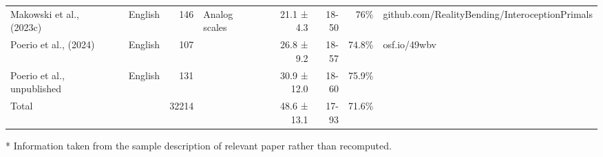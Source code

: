 \begin{table}[!t]
\begin{tabular*}{\linewidth}{@{\extracolsep{\fill}}lllrlrrrl}
Makowski et al., (2023c) &  & English & 146 & Analog scales & 21.1 ± 4.3 & 18-50 & 76\% & github.com/RealityBending/InteroceptionPrimals \\ 
Poerio et al., (2024) &  & English & 107 &  & 26.8 ± 9.2 & 18-57 & 74.8\% & osf.io/49wbv \\ 
Poerio et al., unpublished &  & English & 131 &  & 30.9 ± 12.0 & 18-60 & 75.9\% &  \\ 
Total &  &  & 32214 &  & 48.6 ± 13.1 & 17-93 & 71.6\% &  \\ 
\bottomrule
\end{tabular*}
\begin{minipage}{\linewidth}
* Information taken from the sample description of relevant paper rather than recomputed.\\
\end{minipage}
\end{table}

